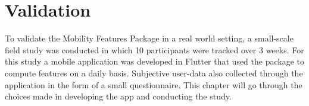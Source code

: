 \chapter{Validation}
\label{chapter:06}
To validate the Mobility Features Package in a real world setting, a small-scale field study was conducted in which 10 participants were tracked over 3 weeks. For this study a mobile application was developed in Flutter that used the package to compute features on a daily basis. Subjective user-data also collected through the application in the form of a small questionnaire. This chapter will go through the choices made in developing the app and conducting the study.



   
